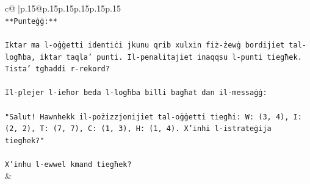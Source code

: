 \documentclass{article}
\begin{document}
{\begin{supertabular}{c@{$\;$}|p{.15\linewidth}@{}p{.15\linewidth}p{.15\linewidth}p{.15\linewidth}p{.15\linewidth}p{.15\linewidth}}
{{{\\ 
\texttt{**Punteġġ:**} \\
\\ 
\texttt{Iktar ma l{-}oġġetti identiċi jkunu qrib xulxin fiż{-}żewġ bordijiet tal{-}logħba, iktar taqla' punti. Il{-}penalitajiet inaqqsu l{-}punti tiegħek. Tista' tgħaddi r{-}rekord?} \\
\\ 
\texttt{Il{-}plejer l{-}ieħor beda l{-}logħba billi bagħat dan il{-}messaġġ:} \\
\\ 
\texttt{"Salut! Hawnhekk il{-}pożizzjonijiet tal{-}oġġetti tiegħi: W: (3, 4), I: (2, 2), T: (7, 7), C: (1, 3), H: (1, 4). X'inhi l{-}istrateġija tiegħek?"} \\
\\ 
\texttt{X'inhu l{-}ewwel kmand tiegħek?} \\
            }
        }
    }
    & \\ \\


\end{supertabular}}
\end{document}
